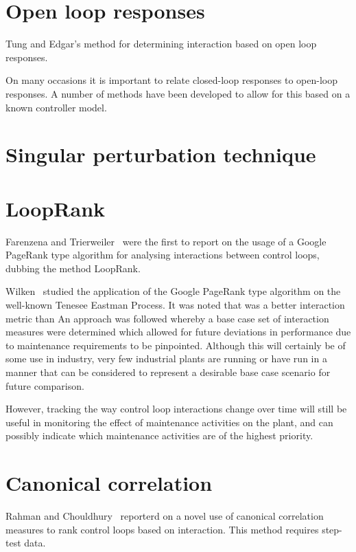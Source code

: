 \section{Open loop responses}

Tung and Edgar's method for determining interaction based on open loop responses. %

On many occasions it is important to relate closed-loop responses to open-loop responses.
A number of methods have been developed to allow for this based on a known controller model.

\section{Singular perturbation technique}








\section{LoopRank}

Farenzena and Trierweiler~\cite{Farenzena2009} were the first to report on the usage of a Google PageRank type algorithm for analysing interactions between control loops, dubbing the method LoopRank.

Wilken~\cite{Wilken2012} studied the application of the Google PageRank type algorithm on the well-known Tenesee Eastman Process.
It was noted that %
was a better interaction metric than
An approach was followed whereby a base case set of interaction measures were determined which allowed for future deviations in performance due to maintenance requirements to be pinpointed.
Although this will certainly be of some use in industry, very few industrial plants are running or have run in a manner that can be considered to represent a desirable base case scenario for future comparison.

However, tracking the way control loop interactions change over time will still be useful in monitoring the effect of maintenance activities on the plant, and can possibly indicate which maintenance activities are of the highest priority.

\section{Canonical correlation}

Rahman and Chouldhury~\cite{Rahman2011} reporterd on a novel use of canonical correlation measures to rank control loops based on interaction.
This method requires step-test data.


